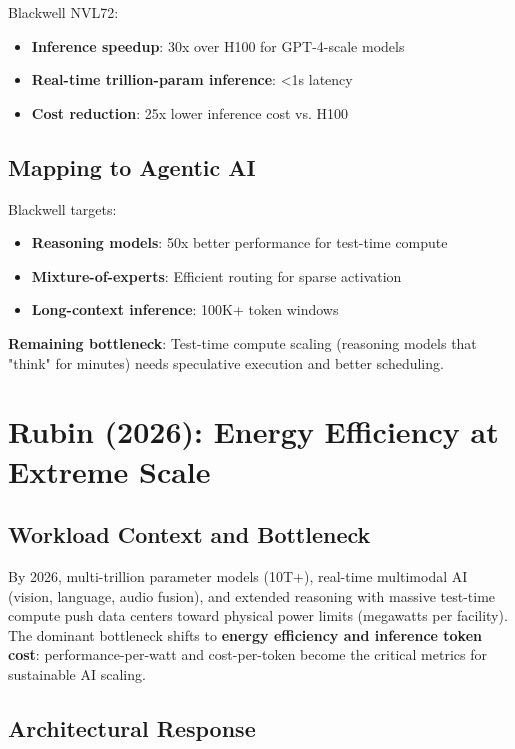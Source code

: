 \documentclass{article}
\begin{document}
Blackwell NVL72:
\begin{itemize}
\item \textbf{Inference speedup}: 30x over H100 for GPT-4-scale models
\item \textbf{Real-time trillion-param inference}: <1s latency
\item \textbf{Cost reduction}: 25x lower inference cost vs. H100
\end{itemize}

\subsection{Mapping to Agentic AI}

Blackwell targets:
\begin{itemize}
\item \textbf{Reasoning models}: 50x better performance for test-time compute
\item \textbf{Mixture-of-experts}: Efficient routing for sparse activation
\item \textbf{Long-context inference}: 100K+ token windows
\end{itemize}

\textbf{Remaining bottleneck}: Test-time compute scaling (reasoning models that "think" for minutes) needs speculative execution and better scheduling.

\section{Rubin (2026): Energy Efficiency at Extreme Scale}

\subsection{Workload Context and Bottleneck}

By 2026, multi-trillion parameter models (10T+), real-time multimodal AI (vision, language, audio fusion), and extended reasoning with massive test-time compute push data centers toward physical power limits (megawatts per facility). The dominant bottleneck shifts to \textbf{energy efficiency and inference token cost}: performance-per-watt and cost-per-token become the critical metrics for sustainable AI scaling.

\subsection{Architectural Response}
\end{document}
